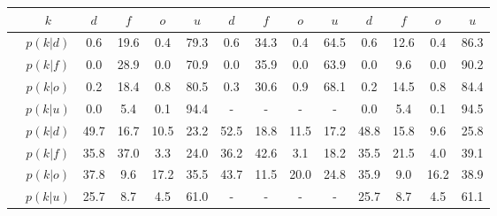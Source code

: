 \begin{figure}[H]
	\footnotesize
	\begin{tabular}{c|c|cccc|cccc|cccc}
		&$k$ & $d$ & $f$ & $o$ & $u$ & $d$ & $f$ & $o$ & $u$ & $d$ & $f$ & $o$ & $u$\\
		\hline
		\parbox[t]{2mm}{}&$p(k|d)$ & \textcolor{mygreen}{0.6} & \textcolor{myred}{19.6} & \textcolor{myred}{0.4} & 79.3 & \textcolor{mygreen}{0.6} & \textcolor{myred}{34.3} & \textcolor{myred}{0.4} & 64.5 & \textcolor{mygreen}{0.6} & \textcolor{myred}{12.6} & \textcolor{myred}{0.4} & 86.3\\
		&$p(k|f)$ & \textcolor{myred}{0.0} & \textcolor{mygreen}{28.9} & \textcolor{myred}{0.0} & 70.9 & \textcolor{myred}{0.0} & \textcolor{mygreen}{35.9} & \textcolor{myred}{0.0} & 63.9 & \textcolor{myred}{0.0} & \textcolor{mygreen}{9.6} & \textcolor{myred}{0.0} & 90.2\\
		&$p(k|o)$ & \textcolor{myred}{0.2} & \textcolor{myred}{18.4} & \textcolor{mygreen}{0.8} & 80.5 & \textcolor{myred}{0.3} & \textcolor{myred}{30.6} & \textcolor{mygreen}{0.9} & 68.1 & \textcolor{myred}{0.2} & \textcolor{myred}{14.5} & \textcolor{mygreen}{0.8} & 84.4\\
		&$p(k|u)$ & 0.0 & 5.4 & 0.1 & 94.4 & - & - & - & - & 0.0 & 5.4 & 0.1 & 94.5\\
		\hline
		\parbox[t]{2mm}{}&$p(k|d)$ & \textcolor{mygreen}{49.7} & \textcolor{myred}{16.7} & \textcolor{myred}{10.5} & 23.2 & \textcolor{mygreen}{52.5} & \textcolor{myred}{18.8} & \textcolor{myred}{11.5} & 17.2 & \textcolor{mygreen}{48.8} & \textcolor{myred}{15.8} & \textcolor{myred}{9.6} & 25.8\\
		&$p(k|f)$ & \textcolor{myred}{35.8} & \textcolor{mygreen}{37.0} & \textcolor{myred}{3.3} & 24.0 & \textcolor{myred}{36.2} & \textcolor{mygreen}{42.6} & \textcolor{myred}{3.1} & 18.2 & \textcolor{myred}{35.5} & \textcolor{mygreen}{21.5} & \textcolor{myred}{4.0} & 39.1\\
		&$p(k|o)$ & \textcolor{myred}{37.8} & \textcolor{myred}{9.6} & \textcolor{mygreen}{17.2} & 35.5 & \textcolor{myred}{43.7} & \textcolor{myred}{11.5} & \textcolor{mygreen}{20.0} & 24.8 & \textcolor{myred}{35.9} & \textcolor{myred}{9.0} & \textcolor{mygreen}{16.2} & 38.9\\
		&$p(k|u)$ & 25.7 & 8.7 & 4.5 & 61.0 & - & - & - & - & 25.7 & 8.7 & 4.5 & 61.1\\

\end{tabular}
\end{figure}
